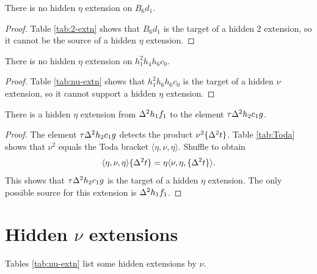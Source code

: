 \begin{lemma}
\label{lem:eta-B6d1}
There is no hidden $\eta$ extension on $B_6 d_1$.
\end{lemma}

\begin{proof}
Table \ref{tab:2-extn} shows that $B_6 d_1$ is the target of a 
hidden $2$ extension, so it cannot be the source of a hidden
$\eta$ extension.
\end{proof}

\begin{lemma}
\label{lem:eta-h1^2h4h6c0}
There is no hidden $\eta$ extension on $h_1^2 h_4 h_6 c_0$.
\end{lemma}

\begin{proof}
Table \ref{tab:nu-extn} shows that $h_1^2 h_6 h_6 c_0$
is the target of a hidden $\nu$ extension, so it cannot support
a hidden $\eta$ extension.
\end{proof}

\begin{lemma}
\label{lem:eta-D^2h1f1}
There is a hidden $\eta$ extension from $\Delta^2 h_1 f_1$ to
the element $\tau \Delta^2 h_2 c_1 g$.
\end{lemma}

\begin{proof}
The element $\tau \Delta^2 h_2 c_1 g$ detects the product
$\nu^2 \{\Delta^2 t\}$.
Table \ref{tab:Toda} shows that $\nu^2$ equals the Toda bracket
$\langle \eta, \nu, \eta \rangle$.
Shuffle to obtain
\[
\langle \eta, \nu, \eta \rangle \{\Delta^2 t\} =
\eta \langle \nu, \eta, \{\Delta^2 t\} \rangle.
\]
This shows that $\tau \Delta^2 h_2 c_1 g$ is the target of a hidden
$\eta$ extension.  The only possible source for this extension
is $\Delta^2 h_1 f_1$.
\end{proof}

\section{Hidden $\nu$ extensions}
\label{sctn:nu-extn}

\begin{thm}
\label{thm:nu-extn}
Tables \ref{tab:nu-extn}  list some hidden extensions by $\nu$.
\end{thm}

